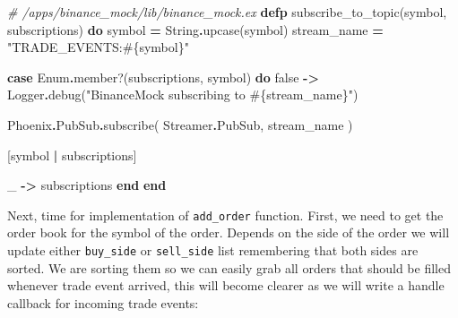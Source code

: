 \documentclass[
  oneside]{book}
\newenvironment{Shaded}{\begin{snugshade}}{\end{snugshade}}
\newcommand{\CommentTok}[1]{\textcolor[rgb]{0.56,0.35,0.01}{\textit{#1}}}
\newcommand{\ConstantTok}[1]{\textcolor[rgb]{0.00,0.00,0.00}{#1}}
\newcommand{\KeywordTok}[1]{\textcolor[rgb]{0.13,0.29,0.53}{\textbf{#1}}}
\newcommand{\NormalTok}[1]{#1}
\newcommand{\OperatorTok}[1]{\textcolor[rgb]{0.81,0.36,0.00}{\textbf{#1}}}
\newcommand{\OtherTok}[1]{\textcolor[rgb]{0.56,0.35,0.01}{#1}}
\newcommand{\StringTok}[1]{\textcolor[rgb]{0.31,0.60,0.02}{#1}}
\begin{document}
\begin{Shaded}
\begin{Highlighting}[]
\CommentTok{\# /apps/binance\_mock/lib/binance\_mock.ex}
  \KeywordTok{defp}\NormalTok{ subscribe\_to\_topic(symbol, subscriptions) }\KeywordTok{do}
\NormalTok{    symbol }\OperatorTok{=} \ConstantTok{String}\OperatorTok{.}\NormalTok{upcase(symbol)}
\NormalTok{    stream\_name }\OperatorTok{=} \StringTok{"TRADE\_EVENTS:}\OtherTok{\#\{}\NormalTok{symbol}\OtherTok{\}}\StringTok{"}

    \KeywordTok{case} \ConstantTok{Enum}\OperatorTok{.}\NormalTok{member?(subscriptions, symbol) }\KeywordTok{do}
      \ConstantTok{false} \OperatorTok{{-}\textgreater{}}
        \ConstantTok{Logger}\OperatorTok{.}\NormalTok{debug(}\StringTok{"BinanceMock subscribing to }\OtherTok{\#\{}\NormalTok{stream\_name}\OtherTok{\}}\StringTok{"}\NormalTok{)}

        \ConstantTok{Phoenix}\OperatorTok{.}\ConstantTok{PubSub}\OperatorTok{.}\NormalTok{subscribe(}
          \ConstantTok{Streamer}\OperatorTok{.}\ConstantTok{PubSub}\NormalTok{,}
\NormalTok{          stream\_name}
\NormalTok{        )}

\NormalTok{        [symbol }\OperatorTok{|}\NormalTok{ subscriptions]}

\NormalTok{      \_ }\OperatorTok{{-}\textgreater{}}
\NormalTok{        subscriptions}
    \KeywordTok{end}
  \KeywordTok{end}
\end{Highlighting}
\end{Shaded}

Next, time for implementation of \texttt{add\_order} function. First, we need to get the order book for the symbol of the order. Depends on the side of the order we will update either \texttt{buy\_side} or \texttt{sell\_side} list remembering that both sides are sorted. We are sorting them so we can easily grab all orders that should be filled whenever trade event arrived, this will become clearer as we will write a handle callback for incoming trade events:
\end{document}
